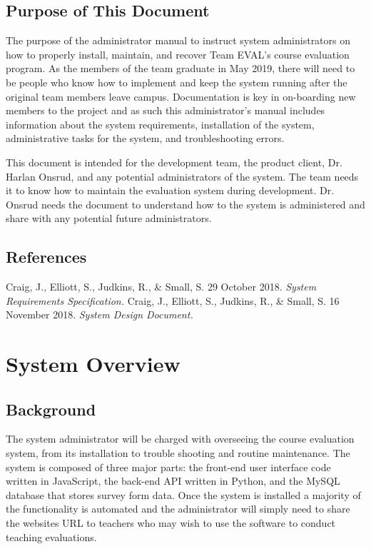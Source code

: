 \documentclass{article}
\begin{document}
\subsection{Purpose of This Document}

The purpose of the administrator manual to instruct system administrators on how to properly install, maintain, and recover Team EVAL's course evaluation program. As the members of the team graduate in May 2019, there will need to be people who know how to implement and keep the system running after the original team members leave campus.  Documentation is key in on-boarding new members to the project and as such this administrator's manual includes information about the system requirements, installation of the system, administrative tasks for the system, and troubleshooting errors.

This document is intended for the development team, the product client, Dr. Harlan Onsrud, and any potential administrators of the system. The team needs it to know how to maintain the evaluation system during development. Dr. Onsrud needs the document to understand how to the system is administered and share with any potential future administrators.

\subsection{References}

Craig, J., Elliott, S., Judkins, R., \& Small, S. 29 October 2018. \textit{System Requirements Specification.}
\vspace{3mm}\newline
Craig, J., Elliott, S., Judkins, R., \& Small, S. 16 November 2018. \textit{System Design Document.}

\section{System Overview}

\subsection{Background}

The system administrator will be charged with overseeing the course evaluation system, from its installation to trouble shooting and routine maintenance. The system is composed of three major parts: the front-end user interface code written in JavaScript, the back-end API written in Python, and the MySQL database that stores survey form data. Once the system is installed a majority of the functionality is automated and the administrator will simply need to share the websites URL to teachers who may wish to use the software to conduct teaching evaluations.
\end{document}
